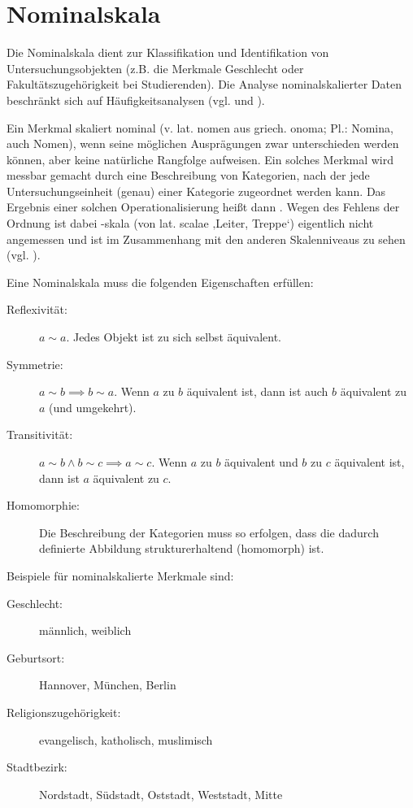 \section{Nominalskala}

Die Nominalskala dient zur Klassifikation und Identifikation von Untersuchungsobjekten (z.B.
die Merkmale Geschlecht oder Fakultätszugehörigkeit bei Studierenden). Die Analyse nominalskalierter
Daten beschränkt sich auf Häufigkeitsanalysen (vgl.  und
).

Ein Merkmal skaliert nominal (v. lat. nomen  aus griech. onoma; Pl.: Nomina, auch Nomen), 
wenn seine möglichen Ausprägungen zwar unterschieden werden können, aber keine natürliche Rangfolge aufweisen.
Ein solches Merkmal wird messbar gemacht durch eine Beschreibung von Kategorien,
nach der jede Untersuchungseinheit (genau) einer Kategorie zugeordnet werden kann. 
Das Ergebnis einer solchen Operationalisierung heißt dann . 
Wegen des Fehlens der Ordnung ist dabei -skala (von lat. scalae ‚Leiter, Treppe‘) eigentlich nicht
angemessen und ist im Zusammenhang mit den anderen Skalenniveaus zu sehen (vgl.
).

Eine Nominalskala muss die folgenden Eigenschaften erfüllen:
\begin{description}
\item[Reflexivität:] $a \sim a$. Jedes Objekt ist zu sich selbst äquivalent.
\item[Symmetrie:] $a \sim b \implies b \sim a$. Wenn $a$ zu $b$ äquivalent ist, dann ist auch $b$ äquivalent zu $a$ (und umgekehrt).
\item[Transitivität:] $a \sim b \land b \sim c \implies a \sim c$. Wenn $a$ zu $b$ äquivalent und $b$ zu $c$ äquivalent ist, dann ist $a$ äquivalent zu $c$.
\item[Homomorphie:] Die Beschreibung der Kategorien muss so erfolgen, dass die dadurch definierte Abbildung strukturerhaltend (homomorph) ist.
\end{description}

Beispiele für nominalskalierte Merkmale sind:
\begin{description}
  \item[Geschlecht:] männlich, weiblich
  \item[Geburtsort:] Hannover, München, Berlin
  \item[Religionszugehörigkeit:] evangelisch, katholisch, muslimisch
  \item[Stadtbezirk:] Nordstadt, Südstadt, Oststadt, Weststadt, Mitte
\end{description}



